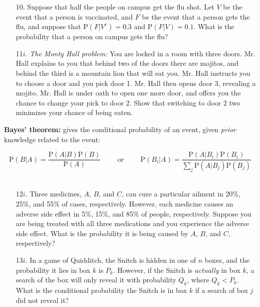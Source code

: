 \documentclass[10pt]{extarticle}
\renewcommand{\P}{\text{P}}
\begin{document}
\hfill 


\begin{itemize}

	\item[10.] Suppose that half the people on campus get the flu shot. Let $V$ be the event that a person is vaccinated, and $F$ be the event that a person gets the flu, and suppose that $\P(F|V^c) = 0.3$ and $\P(F|V) = 0.1$. What is the probability that a person on campus gets the flu? \\ 
	
	\item[11$i$.] {\it The Monty Hall problem:} You are locked in a room with three doors. Mr. Hall explains to you that behind two of the doors there are mojitos, and behind the third is a mountain lion that will eat you. Mr. Hall instructs you to choose a door and you pick door 1. Mr. Hall then opens door 3, revealing a mojito. Mr. Hall is under oath to open one more door, and offers you the chance to change your pick to door 2. Show that switching to door 2 two minimizes your chance of being eaten. 

\end{itemize}

\hfill 

{\bf Bayes' theorem:} gives the conditional probability of an event, given {\it prior} knowledge related to the event:

$$\P(B|A) = \frac{\P(A|B) \P(B)}{\P(A)} \hspace{1cm} \text{or} \hspace{1cm}\P(B_i|A) = \frac{\P(A|B_i)\P(B_i)}{\sum_j \P(A|B_j)\P(B_j)}$$ \ 

\begin{itemize}

	\item[12$i$.] Three medicines, $A$, $B$, and $C$, can cure a particular ailment in 20\%, 25\%, and 55\% of cases, respectively. However, each medicine causes an adverse side effect in 5\%, 15\%, and 85\% of people, respectively. Suppose you are being treated with all three medications and you experience the adverse side effect. What is the probability it is being caused by $A$, $B$, and $C$, respectively? \\  

	\item[13$i$.] In a game of Quidditch, the Snitch is hidden in one of $n$ boxes, and the probability it lies in box $k$ is $P_k$. However, if the Snitch is {\it actually} in box $k$, a search of the box will only reveal it with probability $Q_k$, where $Q_k < P_k$. What is the conditional probability the Snitch is in box $k$ if a search of box $j$ did not reveal it? 

\end{itemize} 
\end{document}
